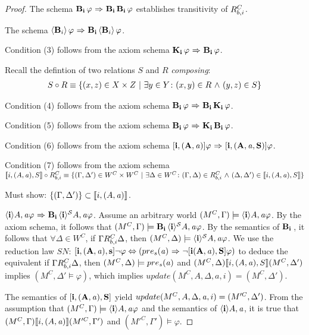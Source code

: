 \begin{proof}
	The schema $\mathbf{B}_{\mathbf{i}}\,\varphi{\ \Rightarrow \ }\mathbf{B}_{\mathbf{i}}\,\mathbf{B}_{\mathbf{i}}\,\varphi$ establishes transitivity of $R_{b,i}^C$.
	
	The schema $\langle \mathbf{B}_{i} \rangle\,\varphi{\ \Rightarrow \ }\mathbf{B}_{\mathbf{i}}\,\langle \mathbf{B}_{i} \rangle\,\varphi$.
	
	Condition (3) follows from the axiom schema $\mathbf{K}_{\mathbf{i}}\,\varphi {\ \Rightarrow \ } \mathbf{B}_{\mathbf{i}}\,\varphi$.
	
Recall the defintion of two relations $S$ and $R$ \emph{composing}:
	\begin{eqnarray*}
	 S \circ R \equiv \{(x,z)\in X\times Z\ |\ \exists y \in Y \colon (x,y)\in R {\ \wedge \ } (y,z) \in S\}
	\end{eqnarray*}
	
	Condition (4) follows from the axiom schema $\mathbf{B}_{\mathbf{i}}\,\varphi{\ \Rightarrow \ }\mathbf{B}_{\mathbf{i}}\,\mathbf{K}_{\mathbf{i}}\,\varphi$.
	
	Condition (5) follows from the axiom schema $\mathbf{B}_{\mathbf{i}}\,\varphi {\ \Rightarrow \ } \mathbf{K}_{\mathbf{i}}\,\mathbf{B}_{\mathbf{i}}\,\varphi$.
	
	Condition (6) follows from the axiom schema $\mathbf{[i, (A,\mathit{a})]}\varphi{\ \Rightarrow \ }\mathbf{[i,(A,\mathit{a},S)]}\varphi$.
	
	Condition (7) follows from the axiom schema \\
	$\llbracket i,(A,\mathit{a}),S \rrbracket \circ R_{b,i}^C \equiv \{(\Gamma,\Delta')\in W^C\times W^C\ |\ \exists \Delta \in W^C \colon (\Gamma,\Delta)\in R_{b,i}^C {\ \wedge \ } (\Delta,\Delta') \in \llbracket i,(A,\mathit{a}),S \rrbracket\}$
	
	
	Must show: $\{(\Gamma,\Delta')\}\subset \llbracket i,(A,\mathit{a}) \rrbracket$.
	
	$\mathbf{\langle i\rangle}{A,\mathit{a}}\varphi{\ \Rightarrow \ }\mathbf{B}_{\mathbf{i}}\,\mathbf{\langle i\rangle^\mathcal{S}}{A,\mathit{a}}\varphi$. Assume an arbitrary world $(M^C,\Gamma)\models\mathbf{\langle i\rangle}{A,\mathit{a}}\varphi$. By the axiom schema, it follows that $(M^C,\Gamma)\models\mathbf{B}_{\mathbf{i}}\,\mathbf{\langle i\rangle^\mathcal{S}}{A,\mathit{a}}\varphi$. By the semantics of $\mathbf{B}_{\mathbf{i}}\,$, it follows that $\forall \Delta\in W^C$, if $\Gamma R_{b,i}^C\Delta$, then $(M^C,\Delta)\models\mathbf{\langle i\rangle^\mathcal{S}}{A,\mathit{a}}\varphi$. We use the reduction law $SN$: $\mathbf{[i,(A,\mathit{a}),s]}{\neg}\varphi \Leftrightarrow (pre_s(\mathit{a}) {\ \Rightarrow \ } {\neg} \mathbf{[i(A,\mathit{a}),S]}\varphi)$ to deduce the equivalent if $\Gamma R_{b,i}^C\Delta$, then $(M^C,\Delta)\models pre_s(\mathit{a})$ and $(M^C,\Delta) \llbracket i,(A,\mathit{a}),S \rrbracket (M^C,\Delta')$ implies $(M^C,\Delta'\models\varphi)$, which implies $update(M^C,A,\Delta,a,i)=(M^C,\Delta')$.
	
	
	The semantics of $\mathbf{[i,(A,\mathit{a}),S]}$ yield $update(M^C, A, \Delta,\mathit{a}, i)=(M'^C,\Delta')$. From the assumption that $(M^C,\Gamma)\models\mathbf{\langle i\rangle}{A,\mathit{a}}\varphi$ and the semantics of $\mathbf{\langle i\rangle}{A,\mathit{a}}$, it is true that $(M^C,\Gamma) \llbracket i,(A,\mathit{a}) \rrbracket (M'^C,\Gamma')$ and $(M'^C,\Gamma') \models \varphi$. 
\end{proof}

